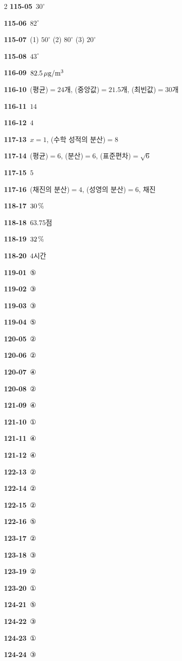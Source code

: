 \documentclass[10pt,a4paper]{article}
\begin{document}
\begin{multicols}{2}
\noindent\textbf{115-05}\ $30^\circ$\par
\noindent\textbf{115-06}\ $82^\circ$\par
\noindent\textbf{115-07}\ (1) $50^\circ$ (2) $80^\circ$ (3) $20^\circ$\par
\noindent\textbf{115-08}\ $43^\circ$\par
\noindent\textbf{116-09}\ $82.5\mkern3mu \mu\mathrm{g}/\mathrm{m}^3$\par
\noindent\textbf{116-10}\ (평균)$=24$개, (중앙값)$=21.5$개, (최빈값)$=30$개\par
\noindent\textbf{116-11}\ $14$\par
\noindent\textbf{116-12}\ $4$\par
\noindent\textbf{117-13}\ $x=1$, (수학 성적의 분산)$=8$\par
\noindent\textbf{117-14}\ (평균)$=6$, (분산)$=6$, (표준편차)$=\sqrt{6}$\par
\noindent\textbf{117-15}\ $5$\par
\noindent\textbf{117-16}\ (채진의 분산)$=4$, (성영의 분산)$=6$, 채진\par
\noindent\textbf{118-17}\ $30\mkern3mu \%$\par
\noindent\textbf{118-18}\ $63.75$점\par
\noindent\textbf{118-19}\ $32\mkern3mu \%$\par
\noindent\textbf{118-20}\ $4$시간\par
\noindent\textbf{119-01}\ ⑤\par
\noindent\textbf{119-02}\ ③\par
\noindent\textbf{119-03}\ ③\par
\noindent\textbf{119-04}\ ⑤\par
\noindent\textbf{120-05}\ ②\par
\noindent\textbf{120-06}\ ②\par
\noindent\textbf{120-07}\ ④\par
\noindent\textbf{120-08}\ ②\par
\noindent\textbf{121-09}\ ④\par
\noindent\textbf{121-10}\ ①\par
\noindent\textbf{121-11}\ ④\par
\noindent\textbf{121-12}\ ④\par
\noindent\textbf{122-13}\ ②\par
\noindent\textbf{122-14}\ ②\par
\noindent\textbf{122-15}\ ②\par
\noindent\textbf{122-16}\ ⑤\par
\noindent\textbf{123-17}\ ②\par
\noindent\textbf{123-18}\ ③\par
\noindent\textbf{123-19}\ ②\par
\noindent\textbf{123-20}\ ①\par
\noindent\textbf{124-21}\ ⑤\par
\noindent\textbf{124-22}\ ③\par
\noindent\textbf{124-23}\ ①\par
\noindent\textbf{124-24}\ ③\par
\end{multicols}
\end{document}
